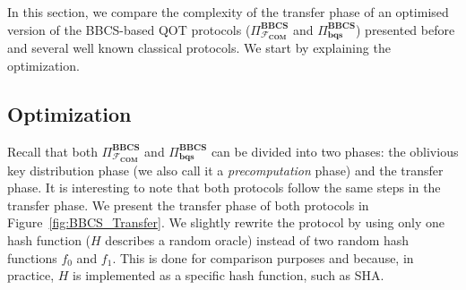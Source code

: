 In this section, we compare the complexity of the transfer phase of an optimised version of the BBCS-based QOT protocols ($\Pi^{\textbf{BBCS}}_{\mathcal{F}_{\textbf{COM}}}$ and $\Pi^{\textbf{BBCS}}_{\textbf{bqs}}$) presented before and several well known classical protocols. We start by explaining the optimization.

\subsection{Optimization}\label{O-OT}

Recall that both $\Pi^{\textbf{BBCS}}_{\mathcal{F}_{\textbf{COM}}}$ and $\Pi^{\textbf{BBCS}}_{\textbf{bqs}}$ can be divided into two phases: the oblivious key distribution phase (we also call it a \textit{precomputation} phase) and the transfer phase. It is interesting to note that both protocols follow the same steps in the transfer phase. We present the transfer phase of both protocols in Figure~\ref{fig:BBCS_Transfer}. We slightly rewrite the protocol by using only one hash function ($H$ describes a random oracle) instead of two random hash functions $f_0$ and $f_1$. This is done for comparison purposes and because, in practice, $H$ is implemented as a specific hash function, such as SHA.

